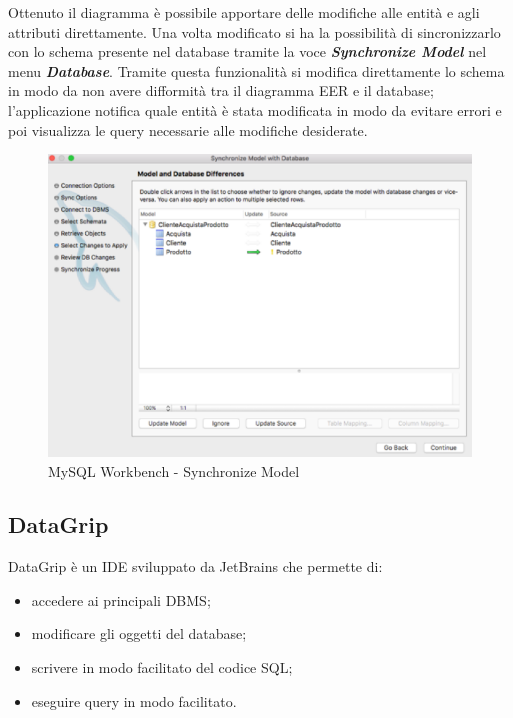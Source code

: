 Ottenuto il diagramma è possibile apportare delle modifiche  alle entità e agli attributi direttamente. Una volta modificato si ha la possibilità di sincronizzarlo con lo schema presente nel database tramite la voce \textit{\textbf{Synchronize Model}} nel menu \textit{\textbf{Database}}. Tramite questa funzionalità si modifica direttamente lo schema in modo da non avere difformità tra il diagramma EER e il database; l'applicazione notifica quale entità è stata modificata in modo da evitare errori e poi visualizza le query necessarie alle modifiche desiderate.

\begin{center}
\begin{figure}[H]
\centering
\includegraphics[scale=0.8]{figures/mySQL_workbench_synchmodel.png}
\caption{MySQL Workbench - Synchronize Model} 
\end{figure}
\end{center}


\subsection{DataGrip}

DataGrip è un IDE sviluppato da JetBrains che permette di:

\begin{itemize}

\item accedere ai principali DBMS;
\item modificare gli oggetti del database;
\item scrivere in modo facilitato del codice SQL;
\item eseguire query in modo facilitato. 

\end{itemize}


